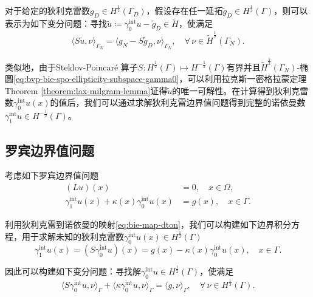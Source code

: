 对于给定的狄利克雷数$g_{D} \in H^{\frac{1}{2}}(\Gamma_{D})$，假设存在任一延拓$\widetilde{g}_{D} \in H^{\frac{1}{2}}(\Gamma)$，则可以表示为如下变分问题：寻找$\widetilde{u} \coloneqq \gamma_{0}^{\text{int}} u - \widetilde{g}_{D} \in \widetilde{H}$，使满足
\begin{equation}
  \label{eq:bie-mixed-indirect-approach}
  \langle S \widetilde{u}, \nu \rangle_{\Gamma_{N}}
  = \langle
  g_{N} - S \widetilde{g}_{D}, \nu
  \rangle_{\Gamma_{N}}, \quad \forall \, \nu \in \widetilde{H}^{\frac{1}{2}}(\Gamma_{N}).
\end{equation}

类似地，由于Steklov-Poincaré 算子$S: H^{\frac{1}{2}}(\Gamma) \mapsto H^{-\frac{1}{2}}(\Gamma)$有界并且$\widetilde{H}^{\frac{1}{2}}(\Gamma_{N})$-椭圆\eqref{eq:bvp-bie-spo-ellipticity-subspace-gamma0}，可以利用拉克斯一密格拉蒙定理Theorem \ref{theorem:lax-milgram-lemma}证得$\widetilde{u}$的唯一可解性。在计算得到狄利克雷数$\gamma_{0}^{\text{int}} u(x)$的值后，我们可以通过求解狄利克雷边界值问题得到完整的诺依曼数$\gamma_{1}^{\text{int}} u \in H^{-\frac{1}{2}}(\Gamma)$。

\subsection{罗宾边界值问题}
\label{sec:bie-robin}

考虑如下罗宾边界值问题
\begin{equation*}
  \begin{split}
    \left( L u \right)(x) & = 0, \quad x \in \Omega, \\
    \gamma_{1}^{\text{int}} u(x) + \kappa (x) \gamma_{0}^{\text{int}} u(x) & = g(x), \quad x \in \Gamma.
  \end{split}
\end{equation*}

利用狄利克雷到诺依曼的映射\eqref{eq:bie-map-dton}，我们可以构建如下边界积分方程，用于求解未知的狄利克雷数$\gamma_{0}^{\text{int}} u(x) \in H^{\frac{1}{2}}(\Gamma)$
\begin{equation*}
  \gamma_{1}^{\text{int}} u(x) =
  \left( S \gamma_{0}^{\text{int}} u \right)(x)
  = g(x) - \kappa(x) \gamma_{0}^{\text{int}} u (x), \quad x \in \Gamma.
\end{equation*}

因此可以构建如下变分问题：寻找解$\gamma_{0}^{\text{int}} u \in H^{\frac{1}{2}}(\Gamma)$，使满足
\begin{equation}
  \label{eq:bie-robin-varitional-problem}
  \langle S \gamma_{0}^{\text{int}} u, \nu \rangle_{\Gamma}
  + \langle \kappa \gamma_{0}^{\text{int}} u, \nu \rangle_{\Gamma}
  = \langle g, \nu \rangle_{\Gamma}, \quad \forall \, \nu \in H^{\frac{1}{2}}(\Gamma).
\end{equation}

